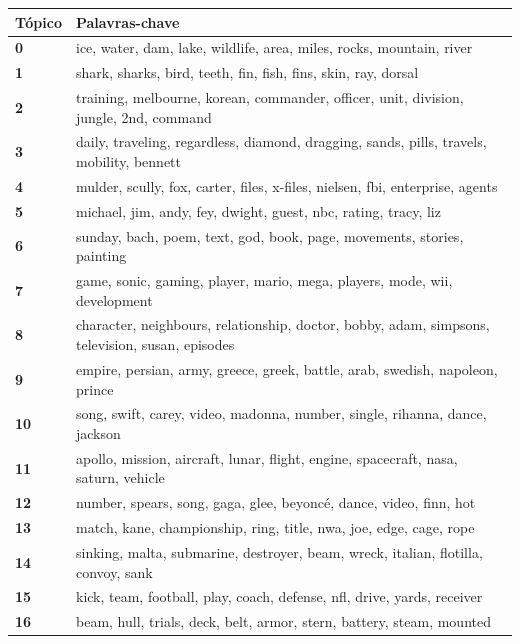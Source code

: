 \begin{table}[htpb]
    \centering
    \scriptsize
    \begin{tabularx}{\textwidth}{@{}l X@{}}
        \toprule
        \textbf{Tópico} & \textbf{Palavras-chave} \\
        \midrule
        \textbf{0} & ice, water, dam, lake, wildlife, area, miles, rocks, mountain, river \\
        \textbf{1} & shark, sharks, bird, teeth, fin, fish, fins, skin, ray, dorsal \\
        \textbf{2} & training, melbourne, korean, commander, officer, unit, division, jungle, 2nd, command \\
        \textbf{3} & daily, traveling, regardless, diamond, dragging, sands, pills, travels, mobility, bennett \\
        \textbf{4} & mulder, scully, fox, carter, files, x-files, nielsen, fbi, enterprise, agents \\
        \textbf{5} & michael, jim, andy, fey, dwight, guest, nbc, rating, tracy, liz \\
        \textbf{6} & sunday, bach, poem, text, god, book, page, movements, stories, painting \\
        \textbf{7} & game, sonic, gaming, player, mario, mega, players, mode, wii, development \\
        \textbf{8} & character, neighbours, relationship, doctor, bobby, adam, simpsons, television, susan, episodes \\
        \textbf{9} & empire, persian, army, greece, greek, battle, arab, swedish, napoleon, prince \\
        \textbf{10} & song, swift, carey, video, madonna, number, single, rihanna, dance, jackson \\
        \textbf{11} & apollo, mission, aircraft, lunar, flight, engine, spacecraft, nasa, saturn, vehicle \\
        \textbf{12} & number, spears, song, gaga, glee, beyoncé, dance, video, finn, hot \\
        \textbf{13} & match, kane, championship, ring, title, nwa, joe, edge, cage, rope \\
        \textbf{14} & sinking, malta, submarine, destroyer, beam, wreck, italian, flotilla, convoy, sank \\
        \textbf{15} & kick, team, football, play, coach, defense, nfl, drive, yards, receiver \\
        \textbf{16} & beam, hull, trials, deck, belt, armor, stern, battery, steam, mounted \\

\end{tabularx}
\end{table}
